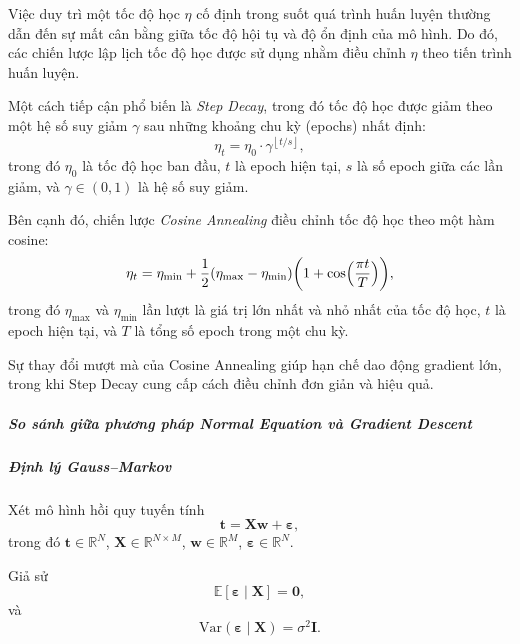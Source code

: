 Việc duy trì một tốc độ học $\eta$ cố định trong suốt quá trình huấn luyện
thường dẫn đến sự mất cân bằng giữa tốc độ hội tụ và độ ổn định của mô hình.
Do đó, các chiến lược lập lịch tốc độ học được sử dụng nhằm điều chỉnh $\eta$
theo tiến trình huấn luyện.

Một cách tiếp cận phổ biến là \emph{Step Decay}, trong đó tốc độ học được
giảm theo một hệ số suy giảm $\gamma$ sau những khoảng chu kỳ (epochs) nhất
định: \begin{equation}
  \eta_t = \eta_0 \cdot \gamma^{\left\lfloor t/s \right\rfloor},
\end{equation} trong đó $\eta_0$ là tốc độ học ban đầu, $t$ là epoch hiện tại,
$s$ là số epoch giữa các lần giảm, và $\gamma \in (0,1)$ là hệ số suy giảm.

Bên cạnh đó, chiến lược \emph{Cosine Annealing} điều chỉnh tốc độ học theo
một hàm cosine: \begin{equation}
  \eta_t = \eta_{\min} + \frac{1}{2}(\eta_{\max} - \eta_{\min})
  \biggl(1 + \cos\Bigl(\frac{\pi t}{T}\Bigr)\biggr),
\end{equation} trong đó $\eta_{\max}$ và $\eta_{\min}$ lần lượt là giá trị lớn
nhất và nhỏ nhất của tốc độ học, $t$ là epoch hiện tại, và $T$ là tổng số epoch
trong một chu kỳ.

Sự thay đổi mượt mà của Cosine Annealing giúp hạn chế dao động gradient lớn,
trong khi Step Decay cung cấp cách điều chỉnh đơn giản và hiệu quả.

\subparagraph{So sánh giữa phương pháp Normal Equation và Gradient Descent}

\subparagraph{Định lý Gauss--Markov}

Xét mô hình hồi quy tuyến tính \begin{equation}
  \boldsymbol{t} = \boldsymbol{X}\boldsymbol{w} + \boldsymbol{\varepsilon},
\end{equation} trong đó $\boldsymbol{t} \in \mathbb{R}^N$, $\boldsymbol{X} \in
\mathbb{R}^{N \times M}$, $\boldsymbol{w} \in \mathbb{R}^M$,
$\boldsymbol{\varepsilon} \in \mathbb{R}^N$.

Giả sử \begin{equation}
  \mathbb{E}[\boldsymbol{\varepsilon} \mid \boldsymbol{X}] = \boldsymbol{0},
\end{equation} và \begin{equation}
  \mathrm{Var}(\boldsymbol{\varepsilon} \mid \boldsymbol{X}) = \sigma^2
  \boldsymbol{I}.
\end{equation}


